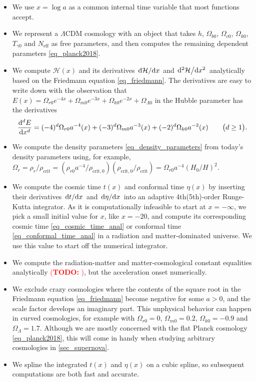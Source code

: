 \documentclass[10pt,a4paper]{article}
\newcommand\TODO[1]{\textcolor{red}{(\textbf{TODO:} #1)}}
\begin{document}
\begin{itemize}
	\item We use $x = \log a$ as a common internal time variable that most functions accept.
	\item We represent a $\Lambda$CDM cosmology with an object that takes $h$, $\Omega_{b0}$, $\Omega_{c0}$, $\Omega_{k0}$, $T_{\gamma0}$ and $N_\text{eff}$ as free parameters, and then computes the remaining dependent parameters \eqref{eq_planck2018}.
	\item We compute $\mathcal{H}(x)$ and its derivatives $\odv{\mathcal{H}}/{x}$ and $\odv[2]{\mathcal{H}}/{x}$ analytically based on the Friedmann equation \eqref{eq_friedmann}.
	      The derivatives are easy to write down with the observation that
		  $E(x) = \Omega_{r0} e^{-4x} + \Omega_{m0} e^{-3x} + \Omega_{k0} e^{-2x} + \Omega_{\Lambda0}$
		  in the Hubble parameter has the derivatives
		  \begin{equation*}
			  \odv[d]{E}{x} = (-4)^d \Omega_{r0} a^{-4}(x) + (-3)^d \Omega_{m0} a^{-3}(x) + (-2)^d \Omega_{k0} a^{-2}(x) \qquad \big(d \geq 1\big).
		  \end{equation*}
	\item We compute the density parameters \eqref{eq_density_parameters} from today's density parameters using, for example, $\Omega_r = \rho_r / \rho_\text{crit} = (\rho_{r0} a^{-4} / \rho_{\text{crit},0}) (\rho_{\text{crit},0} / \rho_\text{crit}) = \Omega_{r0} a^{-4} (H_0 / H)^2$.
	\item We compute the cosmic time $t(x)$ and conformal time $\eta(x)$ by inserting their derivatives $\odv{t}/{x}$ and $\odv{\eta}/{x}$ into an adaptive 4th(5th)-order Runge-Kutta integrator.
	      As it is computationally infeasible to start at $x=-\infty$, we pick a small initial value for $x$, like $x = -20$,
	      and compute its corresponding cosmic time \eqref{eq_cosmic_time_anal} or conformal time \eqref{eq_conformal_time_anal} in a radiation and matter-dominated universe.
	      We use this value to start off the numerical integrator.
	\item We compute the radiation-matter and matter-cosmological constant equalities analytically \TODO{},
	      but the acceleration onset numerically.
	\item We exclude crazy cosmologies where the contents of the square root in the Friedmann equation \eqref{eq_friedmann} become negative for some $a > 0$, and the scale factor develops an imaginary part.
	      This unphysical behavior can happen in curved cosmologies, for example with $\Omega_{r0} = 0$, $\Omega_{m0} = 0.2$, $\Omega_{k0}=-0.9$ and $\Omega_{\Lambda} = 1.7$.
		  Although we are mostly concerned with the flat Planck cosmology \eqref{eq_planck2018}, this will come in handy when studying arbitrary cosmologies in \cref{sec_supernova}.
	\item We spline the integrated $t(x)$ and $\eta(x)$ on a cubic spline, so subsequent computations are both fast and accurate.
\end{itemize}
\end{document}
